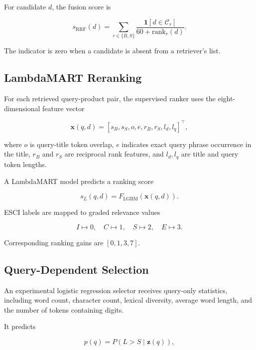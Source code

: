 \documentclass[conference]{IEEEtran}
\begin{document}
For candidate $d$, the fusion score is

\begin{equation}
s_{\mathrm{RRF}}(d)=
\sum_{r\in\{B,S\}}
\frac{
\mathbf{1}[d\in\mathcal{C}_{r}]
}{
60+\mathrm{rank}_{r}(d)
}.
\end{equation}

The indicator is zero when a
candidate is absent from a
retriever's list.

\subsection{LambdaMART Reranking}

For each retrieved query-product pair,
the supervised ranker uses the
eight-dimensional feature vector

\begin{equation}
\mathbf{x}(q,d)=
[
s_B,s_S,o,e,r_B,r_S,l_d,l_q
]^\top,
\end{equation}

where $o$ is query-title token
overlap, $e$ indicates exact
query phrase occurrence in the
title, $r_B$ and $r_S$ are reciprocal
rank features, and $l_d,l_q$
are title and query token lengths.

A LambdaMART model predicts a
ranking score

\begin{equation}
s_L(q,d)=F_{\mathrm{LGBM}}
(\mathbf{x}(q,d)).
\end{equation}

ESCI labels are mapped to
graded relevance values

\begin{equation}
I\mapsto0,\quad
C\mapsto1,\quad
S\mapsto2,\quad
E\mapsto3.
\end{equation}

Corresponding ranking gains are
$[0,1,3,7]$.

\subsection{Query-Dependent Selection}

An experimental logistic regression
selector receives query-only statistics,
including word count, character
count, lexical diversity, average
word length, and the number of tokens
containing digits.

It predicts

\begin{equation}
p(q)=P(L>S\mid\mathbf{z}(q)),
\end{equation}
\end{document}
